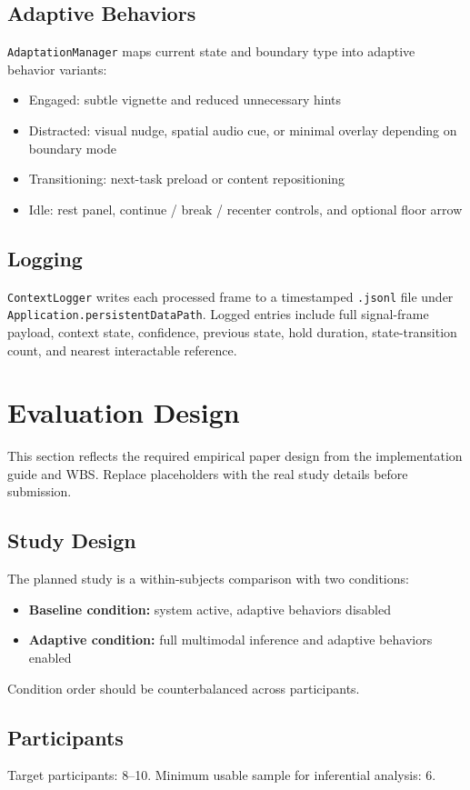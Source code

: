 \documentclass[10pt,twocolumn]{article}
\begin{document}
\subsection{Adaptive Behaviors}
\texttt{AdaptationManager} maps current state and boundary type into adaptive behavior variants:
\begin{itemize}[leftmargin=1.2em]
  \item Engaged: subtle vignette and reduced unnecessary hints
  \item Distracted: visual nudge, spatial audio cue, or minimal overlay depending on boundary mode
  \item Transitioning: next-task preload or content repositioning
  \item Idle: rest panel, continue / break / recenter controls, and optional floor arrow
\end{itemize}

\subsection{Logging}
\texttt{ContextLogger} writes each processed frame to a timestamped \texttt{.jsonl} file under \texttt{Application.persistentDataPath}. Logged entries include full signal-frame payload, context state, confidence, previous state, hold duration, state-transition count, and nearest interactable reference.

\section{Evaluation Design}
This section reflects the required empirical paper design from the implementation guide and WBS. Replace placeholders with the real study details before submission.

\subsection{Study Design}
The planned study is a within-subjects comparison with two conditions:
\begin{itemize}[leftmargin=1.2em]
  \item \textbf{Baseline condition:} system active, adaptive behaviors disabled
  \item \textbf{Adaptive condition:} full multimodal inference and adaptive behaviors enabled
\end{itemize}
Condition order should be counterbalanced across participants.

\subsection{Participants}
Target participants: 8--10. Minimum usable sample for inferential analysis: 6.
\end{document}
